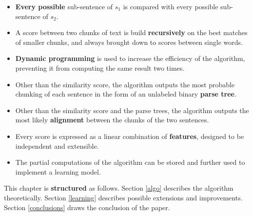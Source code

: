 \begin{itemize}
\item \textbf{Every possible} sub-sentence of $s_1$ is compared with every possible sub-sentence of $s_2$.
\item A score between two chunks of text is build \textbf{recursively} on the best matches of smaller chunks, and always brought down to scores between single words.
\item \textbf{Dynamic programming} is used to increase the efficiency of the algorithm, preventing it from computing the same result two times.
\item Other than the similarity score, the algorithm outputs the most probable chunking of each sentence in the form of an unlabeled binary \textbf{parse tree}.
\item Other than the similarity score and the parse trees, the algorithm outputs the most likely \textbf{alignment} between the chunks of the two sentences.
\item Every score is expressed as a linear combination of \textbf{features}, designed to be independent and extensible.
\item The partial computations of the algorithm can be stored and further used to implement a learning model.
\end{itemize}

This chapter is \textbf{structured} as follows. Section \ref{algo} describes the algorithm theoretically. %
Section \ref{learning} describes possible extensions and improvements. Section \ref{conclusions} draws the conclusion of the paper.

